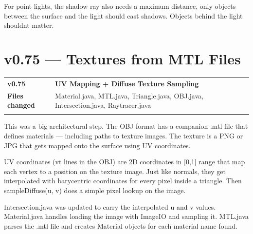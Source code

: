 \documentclass[
]{article}
\newcounter{none} %
\begin{document}
For point lights, the shadow ray also needs a maximum distance, only
objects between the surface and the light should cast shadows. Objects
behind the light shouldn\textquotesingle t matter.

\section{\texorpdfstring{\textbf{v0.75 --- Textures from MTL
Files}}{v0.75 --- Textures from MTL Files}}\label{v0.75-textures-from-mtl-files}

{\def\LTcaptype{none} %
\begin{longtable}[]{@{}
  >{\raggedright\arraybackslash}p{}
  >{\raggedright\arraybackslash}p{}@{}}
\toprule\noalign{}
\begin{minipage}[b]{\linewidth}\raggedright
\textbf{v0.75}
\end{minipage} & \begin{minipage}[b]{\linewidth}\raggedright
\textbf{UV Mapping + Diffuse Texture Sampling}
\end{minipage} \\
\begin{minipage}[b]{\linewidth}\raggedright
\textbf{Files changed}
\end{minipage} & \begin{minipage}[b]{\linewidth}\raggedright
Material.java, MTL.java, Triangle.java, OBJ.java, Intersection.java,
Raytracer.java
\end{minipage} \\
\midrule\noalign{}
\endhead
\bottomrule\noalign{}
\endlastfoot
\end{longtable}
}

This was a big architectural step. The OBJ format has a companion .mtl
file that defines materials --- including paths to texture images. The
texture is a PNG or JPG that gets mapped onto the surface using UV
coordinates.

UV coordinates (vt lines in the OBJ) are 2D coordinates in {[}0,1{]}
range that map each vertex to a position on the texture image. Just like
normals, they get interpolated with barycentric coordinates for every
pixel inside a triangle. Then sampleDiffuse(u, v) does a simple pixel
lookup on the image.

Intersection.java was updated to carry the interpolated u and v values.
Material.java handles loading the image with ImageIO and sampling it.
MTL.java parses the .mtl file and creates Material objects for each
material name found.
\end{document}
